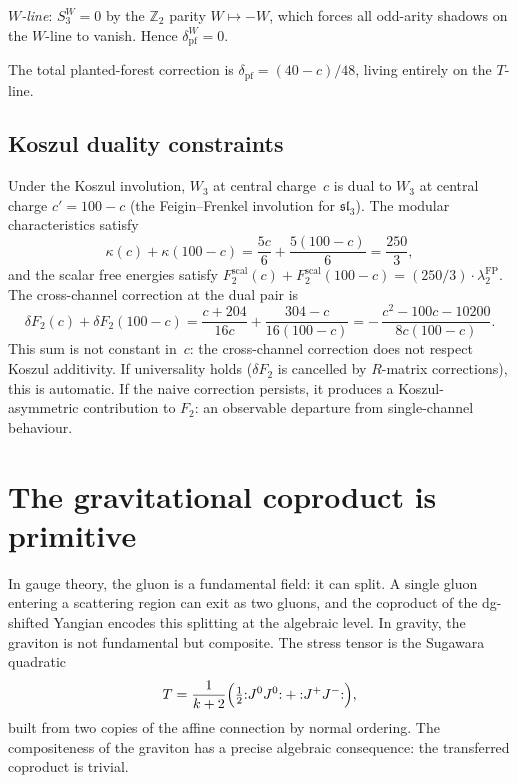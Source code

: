 \emph{$W$-line}: $S_3^W = 0$ by the $\mathbb{Z}_2$ parity
$W \mapsto -W$, which forces all odd-arity shadows on the $W$-line
to vanish. Hence $\delta_{\mathrm{pf}}^W = 0$.

The total planted-forest correction is $\delta_{\mathrm{pf}} =
(40-c)/48$, living entirely on the $T$-line.


\subsection{Koszul duality constraints}
\label{subsec:w3-koszul-duality}

Under the Koszul involution, $W_3$ at central charge~$c$ is
dual to $W_3$ at central charge $c' = 100 - c$
(the Feigin--Frenkel involution for $\mathfrak{sl}_3$). The modular
characteristics satisfy
\begin{equation}
\kappa(c) + \kappa(100-c) = \frac{5c}{6} + \frac{5(100-c)}{6}
= \frac{250}{3},
\end{equation}
and the scalar free energies satisfy $F_2^{\mathrm{scal}}(c) +
F_2^{\mathrm{scal}}(100-c) = (250/3) \cdot \lambda_2^{\mathrm{FP}}$.
The cross-channel correction at the dual pair is
\[
\delta F_2(c) + \delta F_2(100-c)
= \frac{c+204}{16c} + \frac{304-c}{16(100-c)}
= -\,\frac{c^2 - 100c - 10200}{8c(100-c)}.
\]
This sum is not constant in~$c$: the cross-channel correction does
not respect Koszul additivity. If universality holds ($\delta F_2$
is cancelled by $R$-matrix corrections), this is automatic. If
the naive correction persists, it produces a Koszul-asymmetric
contribution to $F_2$: an observable departure from single-channel
behaviour.


\section{The gravitational coproduct is primitive}
\label{sec:gravitational-coproduct}

In gauge theory, the gluon is a fundamental field: it can split.
A single gluon entering a scattering region can exit as two gluons,
and the coproduct of the dg-shifted Yangian encodes this splitting
at the algebraic level. In gravity, the graviton is not fundamental
but composite. The stress tensor is the Sugawara quadratic
\begin{equation}\label{eq:sugawara}
T = \frac{1}{k+2}\Bigl(\tfrac{1}{2} {:}J^0 J^0{:}
+ {:}J^+ J^-{:}\Bigr),
\end{equation}
built from two copies of the affine connection by normal ordering.
The compositeness of the graviton has a precise algebraic
consequence: the transferred coproduct is trivial.


